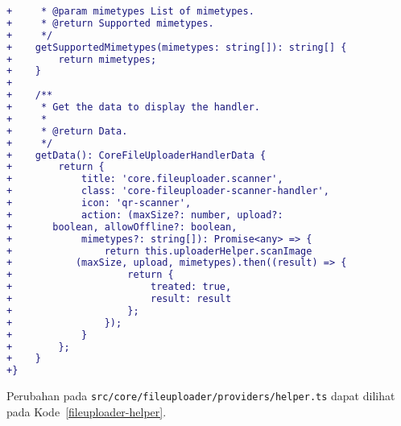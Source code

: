 \begin{lstlisting}[language=diff, frame=single, label ={scanner-handler}, caption = File \texttt{scanner-handler.ts} ]
+     * @param mimetypes List of mimetypes.
+     * @return Supported mimetypes.
+     */
+    getSupportedMimetypes(mimetypes: string[]): string[] {
+        return mimetypes;
+    }
+
+    /**
+     * Get the data to display the handler.
+     *
+     * @return Data.
+     */
+    getData(): CoreFileUploaderHandlerData {
+        return {
+            title: 'core.fileuploader.scanner',
+            class: 'core-fileuploader-scanner-handler',
+            icon: 'qr-scanner',
+            action: (maxSize?: number, upload?: 
+	    boolean, allowOffline?: boolean, 
+            mimetypes?: string[]): Promise<any> => {
+                return this.uploaderHelper.scanImage
+	        (maxSize, upload, mimetypes).then((result) => {
+                    return {
+                        treated: true,
+                        result: result
+                    };
+                });
+            }
+        };
+    }
+}
\end{lstlisting} 

Perubahan pada \texttt{src/core/fileuploader/providers/helper.ts} dapat dilihat pada \mbox{Kode \ref{fileuploader-helper}}. 

